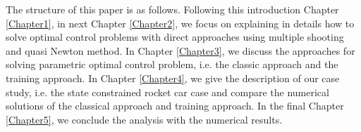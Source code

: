 \documentclass  [
  paper    = a4,
  BCOR     = 10mm,
  twoside,
  fontsize = 12pt,
  fleqn,
  toc      = bibnumbered,
  toc      = listofnumbered,
  numbers  = noendperiod,
  headings = normal,
  listof   = leveldown,
  version  = 3.03
]                                       {scrreprt}
\newcommand{\<}{\langle}
\renewcommand{\>}{\rangle}
\begin{document}


The structure of this paper is as follows. Following this introduction Chapter \ref{Chapter1}, in next Chapter \ref{Chapter2}, we focus on explaining in details how to solve optimal control problems with direct approaches using multiple shooting and quasi Newton method. In Chapter \ref{Chapter3}, we discuss the approaches for solving parametric optimal control problem, i.e. the classic approach and the training approach. In Chapter \ref{Chapter4}, we give the description of our case study, i.e. the state constrained rocket car case and compare the numerical solutions of the classical approach and training approach. In the final Chapter \ref{Chapter5}, we conclude the analysis with the numerical results. 

\end{document}
